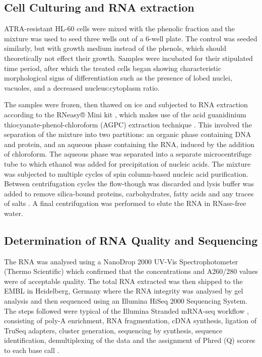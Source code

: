 \subsection{Cell Culturing and RNA extraction}%
\ac{ATRA}-resistant HL-60 cells were mixed with the phenolic fraction and the mixture was used to seed three wells out of a 6-well plate. The control was seeded similarly, but with growth medium instead of the phenols, which should theoretically not effect their growth. Samples were incubated for their stipulated time period, after which the treated cells began showing characteristic morphological signs of differentiation such as the presence of lobed nuclei, vacuoles, and a decreased nucleus:cytoplasm ratio.

The samples were frozen, then thawed on ice and subjected to RNA extraction according to the RNeasy® Mini kit \citep{RNeasy}, which makes use of the acid guanidinium thiocyanate-phenol-chloroform (AGPC) extraction technique \citep{chomczynski1987single}. This involved the separation of the mixture into two partitions: an organic phase containing DNA and protein, and an aqueous phase containing the RNA, induced by the addition of chloroform. The aqueous phase was separated into a separate microcentrifuge tube to which ethanol was added for precipitation of nucleic acids. The mixture was subjected to multiple cycles of spin column-based nucleic acid purification. Between centrifugation cycles the flow-though was discarded and lysis buffer was added to remove silica-bound proteins, carbohydrates, fatty acids and any traces of salts \citep{matson2009microarray}. A final centrifugation was performed to elute the RNA in RNase-free water.

\subsection{Determination of RNA Quality and Sequencing}%
The RNA was analysed using a NanoDrop 2000 UV-Vis Spectrophotometer (Thermo Scientific) which confirmed that the concentrations and A260/280 values were of acceptable quality. The total RNA extracted was then shipped to the \ac{EMBL} in Heidelberg, Germany where the RNA integrity was analysed by gel analysis and then sequenced using an Illumina HiSeq 2000 Sequencing System. The steps followed were typical of the Illumina Stranded mRNA-seq workflow \citep{HiSeq2000}, consisting of poly-A enrichment, RNA fragmentation, cDNA synthesis, ligation of TruSeq adapters, cluster generation, sequencing by synthesis, sequence identification, demultiplexing of the data and the assignment of Phred (Q) scores to each base call \citep{zhong2011high, wang2011low, pease2012rapid}.


